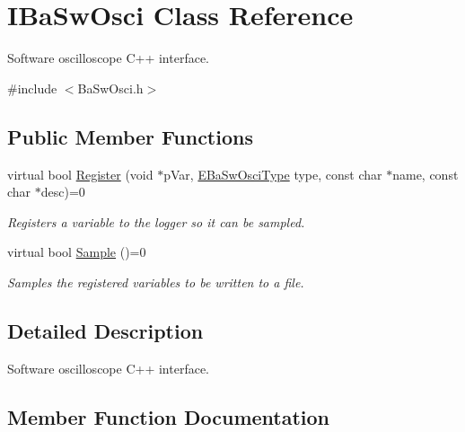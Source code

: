 \hypertarget{classIBaSwOsci}{}\section{I\+Ba\+Sw\+Osci Class Reference}
\label{classIBaSwOsci}


Software oscilloscope C++ interface.  




{\ttfamily \#include $<$Ba\+Sw\+Osci.\+h$>$}

\subsection*{Public Member Functions}
\begin{DoxyCompactItemize}
\item 
virtual bool \hyperlink{classIBaSwOsci_ac04ce939f45bd7c9cc7270c9dcb3c02d}{Register} (void $\ast$p\+Var, \hyperlink{BaSwOsci_8h_abf69cee9886990d98598cd2abcf3ebfc}{E\+Ba\+Sw\+Osci\+Type} type, const char $\ast$name, const char $\ast$desc)=0
\begin{DoxyCompactList}\small\item\em Registers a variable to the logger so it can be sampled. \end{DoxyCompactList}\item 
virtual bool \hyperlink{classIBaSwOsci_a72219859525f1c1af136d1a8081bb1a7}{Sample} ()=0
\begin{DoxyCompactList}\small\item\em Samples the registered variables to be written to a file. \end{DoxyCompactList}\end{DoxyCompactItemize}


\subsection{Detailed Description}
Software oscilloscope C++ interface. 

\subsection{Member Function Documentation}
\mbox{\label{classIBaSwOsci_ac04ce939f45bd7c9cc7270c9dcb3c02d}} 
